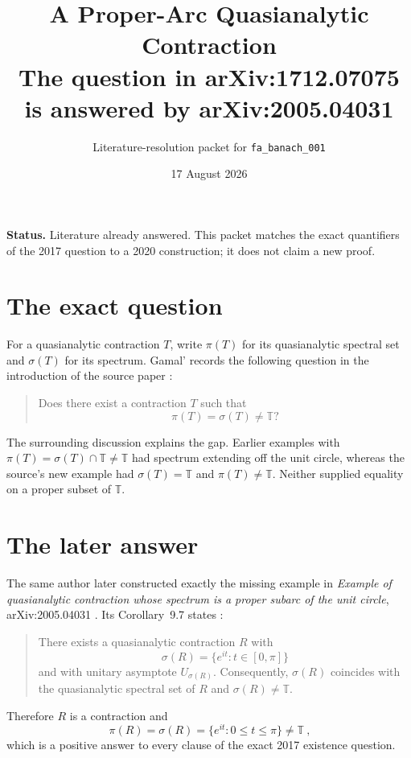 \documentclass[11pt]{article}
\title{A Proper-Arc Quasianalytic Contraction\\
\large The question in arXiv:1712.07075 is answered by arXiv:2005.04031}
\author{Literature-resolution packet for \texttt{fa\_banach\_001}}
\date{17 August 2026}
\newcommand{\T}{\mathbb T}
\newcommand{\spectrum}{\sigma}
\begin{document}
\maketitle

\noindent\textbf{Status.}
Literature already answered.  This packet matches the exact quantifiers of
the 2017 question to a 2020 construction; it does not claim a new proof.

\section{The exact question}

For a quasianalytic contraction $T$, write $\pi(T)$ for its quasianalytic
spectral set and $\spectrum(T)$ for its spectrum.  Gamal' records the
following question in the introduction of the source paper
\cite[PDF p.~3]{source}:

\begin{quote}
Does there exist a contraction $T$ such that
\[
                 \pi(T)=\spectrum(T)\ne\T ?
\]
\end{quote}

The surrounding discussion explains the gap.  Earlier examples with
$\pi(T)=\spectrum(T)\cap\T\ne\T$ had spectrum extending off the unit circle,
whereas the source's new example had $\spectrum(T)=\T$ and
$\pi(T)\ne\T$.  Neither supplied equality on a proper subset of $\T$.

\section{The later answer}

The same author later constructed exactly the missing example in
\emph{Example of quasianalytic contraction whose spectrum is a proper subarc
of the unit circle}, arXiv:2005.04031 \cite{answer}.  Its Corollary~9.7 states
\cite[Corollary~9.7, PDF p.~27]{answer}:

\begin{quote}
There exists a quasianalytic contraction $R$ with
\[
 \spectrum(R)=\{e^{it}:t\in[0,\pi]\}
\]
and with unitary asymptote $U_{\spectrum(R)}$.  Consequently,
$\spectrum(R)$ coincides with the quasianalytic spectral set of $R$ and
$\spectrum(R)\ne\T$.
\end{quote}

Therefore $R$ is a contraction and
\[
 \boxed{\ \pi(R)=\spectrum(R)=\{e^{it}:0\le t\le\pi\}\ne\T\ },
\]
which is a positive answer to every clause of the exact 2017 existence
question.
\end{document}
